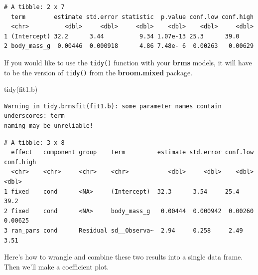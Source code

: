 \documentclass[
  letterpaper,
  DIV=11,
  numbers=noendperiod]{scrartcl}
\newenvironment{Shaded}{\begin{snugshade}}{\end{snugshade}}
\newcommand{\FunctionTok}[1]{\textcolor[rgb]{0.28,0.35,0.67}{#1}}
\newcommand{\NormalTok}[1]{\textcolor[rgb]{0.00,0.23,0.31}{#1}}
\begin{document}
\begin{verbatim}
# A tibble: 2 x 7
  term        estimate std.error statistic  p.value conf.low conf.high
  <chr>          <dbl>     <dbl>     <dbl>    <dbl>    <dbl>     <dbl>
1 (Intercept) 32.2      3.44          9.34 1.07e-13 25.3      39.0    
2 body_mass_g  0.00446  0.000918      4.86 7.48e- 6  0.00263   0.00629
\end{verbatim}

If you would like to use the \texttt{tidy()} function with your
\textbf{brms} models, it will have to be the version of \texttt{tidy()}
from the \textbf{broom.mixed} package.

\begin{Shaded}
\begin{Highlighting}[]
\FunctionTok{tidy}\NormalTok{(fit1.b)}
\end{Highlighting}
\end{Shaded}

\begin{verbatim}
Warning in tidy.brmsfit(fit1.b): some parameter names contain underscores: term
naming may be unreliable!
\end{verbatim}

\begin{verbatim}
# A tibble: 3 x 8
  effect   component group    term         estimate std.error conf.low conf.high
  <chr>    <chr>     <chr>    <chr>           <dbl>     <dbl>    <dbl>     <dbl>
1 fixed    cond      <NA>     (Intercept)  32.3      3.54     25.4      39.2    
2 fixed    cond      <NA>     body_mass_g   0.00444  0.000942  0.00260   0.00625
3 ran_pars cond      Residual sd__Observa~  2.94     0.258     2.49      3.51   
\end{verbatim}

Here's how to wrangle and combine these two results into a single data
frame. Then we'll make a coefficient plot.
\end{document}
